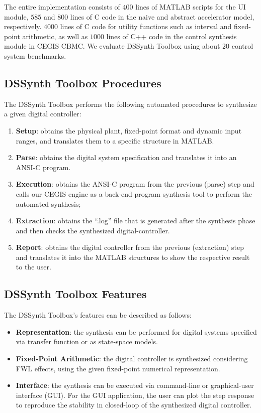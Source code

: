 \documentclass[10pt,conference]{IEEEtran}
\newcommand\tool{{DSSynth Toolbox}\xspace}
\begin{document}
The entire implementation consists of $400$ lines of MATLAB scripts for the UI
module, $585$ and $800$ lines of C code in the naive and abstract accelerator
model, respectively.  $4000$ lines of C code for utility functions such as
interval and fixed-point arithmetic, as well as $1000$ lines of C++ code in the
control synthesis module in CEGIS CBMC.  We evaluate \tool using about $20$ 
control system benchmarks.

\subsection{\tool Procedures}

The \tool performs the following automated procedures 
to synthesize a given digital controller:

\begin{enumerate}
\item \textbf{Setup}: obtains the physical plant, fixed-point format 
and dynamic input ranges, and translates them to a specific structure in MATLAB.
\item \textbf{Parse}: obtains the digital system specification and translates 
it into an ANSI-C program.
\item \textbf{Execution}: obtains the ANSI-C program from the previous (parse) step 
and calls our CEGIS engine as a back-end program synthesis tool to perform the automated synthesis;
\item \textbf{Extraction}: obtains the ``.log'' file that is generated 
after the synthesis phase and then checks the synthesized digital-controller.
\item \textbf{Report}: obtains the digital controller from the previous (extraction) step 
and translates it into the MATLAB structures to show the respective result to the user.
\end{enumerate}

\subsection{\tool Features}

The \tool's features can be described as follows:

\begin{itemize}
\item \textbf{Representation}: the synthesis can be 
performed for digital systems specified via 
transfer function or as state-space models.
\item \textbf{Fixed-Point Arithmetic}: the digital 
controller is synthesized considering FWL effects, 
using the given fixed-point numerical representation.
\item \textbf{Interface}: the synthesis can be executed 
via command-line or graphical-user interface (GUI). 
For the GUI application, the user can plot the step response 
to reproduce the stability in closed-loop of the synthesized digital controller.
\end{itemize}
\end{document}

